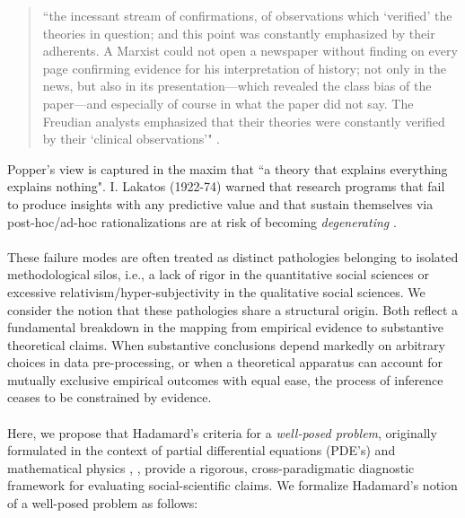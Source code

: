 \documentclass{article}
\theoremstyle{definition}
\begin{document}
\begin{quote}
``the incessant stream of confirmations, of observations which `verified' the theories in question; and this point was constantly emphasized by their adherents. A
Marxist could not open a newspaper without finding on every page confirming evidence for his interpretation of history; not only in the news, but also in its presentation—which revealed the class bias of the paper—and especially of course in what the paper did not say. The Freudian analysts emphasized that their theories were constantly verified by their `clinical observations'" \cite{Pop63}.
\end{quote}

\noindent
Popper's view is captured in the maxim that ``a theory that explains everything explains nothing". I. Lakatos (1922-74) warned that research programs that fail to produce insights with any predictive value and that sustain themselves via post-hoc/ad-hoc rationalizations are at risk of becoming \textit{degenerating} \cite{Lak78}. \\
\\
These failure modes are often treated as distinct pathologies belonging to isolated methodological silos, i.e., a lack of rigor in the quantitative social sciences or excessive relativism/hyper-subjectivity in the qualitative social sciences. We consider the notion that these pathologies share a structural origin. Both reflect a fundamental breakdown in the mapping from empirical evidence to substantive theoretical claims. When substantive conclusions depend markedly on arbitrary choices in data pre-processing, or when a theoretical apparatus can account for mutually exclusive empirical outcomes with equal ease, the process of inference ceases to be constrained by evidence. \\
\\
Here, we propose that Hadamard’s criteria for a \textit{well-posed problem}, originally formulated in the context of partial differential equations (PDE's) and mathematical physics \cite{Had1902}, \cite{Had1923}, provide a rigorous, cross-paradigmatic diagnostic framework for evaluating social-scientific claims. We formalize Hadamard's notion of a well-posed problem as follows:
\end{document}
